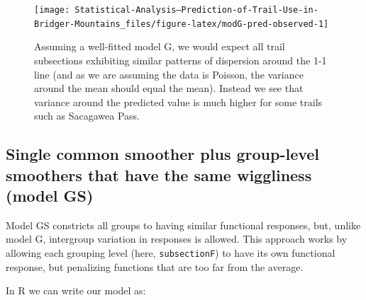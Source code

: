 \documentclass[
]{book}
\begin{document}
\begin{figure}

{\centering \texttt{[image: Statistical-Analysis--Prediction-of-Trail-Use-in-Bridger-Mountains\_files/figure-latex/modG-pred-observed-1]} 

}

\caption{Assuming a well-fitted model G, we would expect all trail subsections exhibiting similar patterns of dispersion around the 1-1 line (and as we are assuming the data is Poisson, the variance around the mean should equal the mean). Instead we see that variance around the predicted value is much higher for some trails such as Sacagawea Pass.}\label{fig:modG-pred-observed}
\end{figure}

\hypertarget{single-common-smoother-plus-group-level-smoothers-that-have-the-same-wiggliness-model-gs}{%
\subsection{Single common smoother plus group-level smoothers that have the same wiggliness (model GS)}\label{single-common-smoother-plus-group-level-smoothers-that-have-the-same-wiggliness-model-gs}}

Model GS constricts all groups to having similar functional responses, but, unlike model G, intergroup variation in responses is allowed. This approach works by allowing each grouping level (here, \texttt{subsectionF}) to have its own functional response, but penalizing functions that are too far from the average.

In R we can write our model as:
\end{document}
